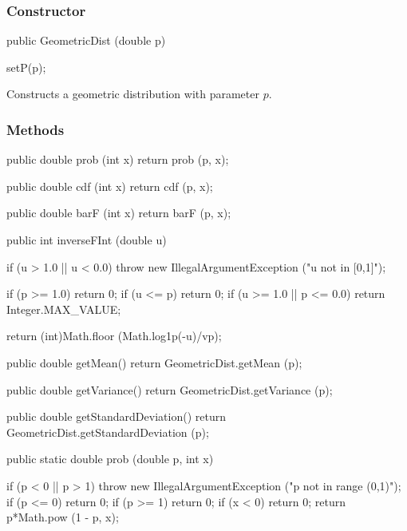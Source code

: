 \subsubsection* {Constructor}
\begin{code}

   public GeometricDist (double p)\begin{hide} {
      setP(p);
   }\end{hide}
\end{code}
\begin{tabb} Constructs a geometric distribution with parameter $p$.
\end{tabb}

\subsubsection* {Methods}
\begin{hide}\begin{code}

   public double prob (int x) {
      return prob (p, x);
   }

   public double cdf (int x) {
      return cdf (p, x);
   }

   public double barF (int x) {
      return barF (p, x);
   }

   public int inverseFInt (double u) {
        if (u > 1.0 || u < 0.0)
            throw new IllegalArgumentException ("u not in [0,1]");

        if (p >= 1.0)
            return 0;
        if (u <= p)
            return 0;
        if (u >= 1.0 || p <= 0.0)
            return Integer.MAX_VALUE;

        return (int)Math.floor (Math.log1p(-u)/vp);
   }

   public double getMean() {
      return GeometricDist.getMean (p);
   }

   public double getVariance() {
      return GeometricDist.getVariance (p);
   }

   public double getStandardDeviation() {
      return GeometricDist.getStandardDeviation (p);
   }

\end{code}\end{hide}
\begin{code}

   public static double prob (double p, int x)\begin{hide} {
      if (p < 0 || p > 1)
         throw new IllegalArgumentException ("p not in range (0,1)");
      if (p <= 0)
         return 0;
      if (p >= 1)
         return 0;
      if (x < 0)
         return 0;
      return p*Math.pow (1 - p, x);
   }\end{hide}
\end{code}
